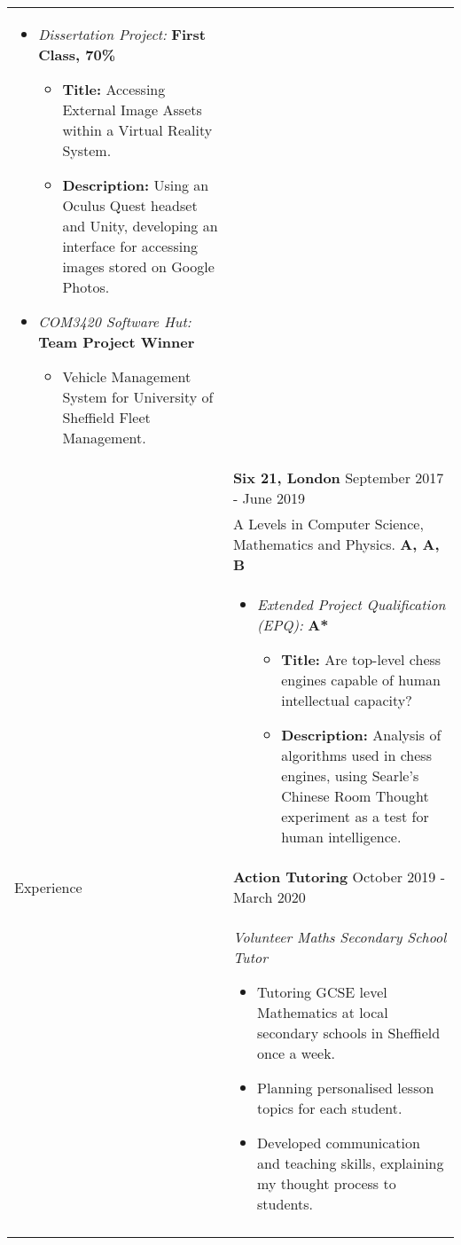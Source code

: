 \documentclass[11pt]{article}
\begin{document}
\begin{minipage}[t][0pt]{\linewidth}
\begin{tabular}[t]{p{2cm} p{14cm}}
	    \begin{itemize}
    		\renewcommand{\labelitemi}{$\diamond$}
        	    \item \textit{Dissertation Project:} \hfill \textbf{First Class, 70\%} 
        	    \begin{itemize}
    				\renewcommand{\labelitemii}{$\cdot$}
        			\item \textbf{Title:} Accessing External Image Assets within a Virtual Reality System.
        			\item \textbf{Description:} Using an Oculus Quest headset and Unity, developing an interface for accessing images stored on Google Photos.
			    \end{itemize}
	        	\item \textit{COM3420 Software Hut:} \hfill \textbf{Team Project Winner} 
        	    \begin{itemize}
    				\renewcommand{\labelitemii}{$\cdot$}
        			\item Vehicle Management System for University of Sheffield Fleet Management.
		        \end{itemize}
		\end{itemize} \\ &
		
		\textbf{Six 21, London} \hfill September 2017 - June 2019 \\ &
		A Levels in Computer Science, Mathematics and Physics. \hfill \textbf{A, A, B} \\ &
		
	    \begin{itemize}
    		\renewcommand{\labelitemi}{$\diamond$}
        	    \item \textit{Extended Project Qualification (EPQ):} \hfill \textbf{A*} 
        	    \begin{itemize}
    				\renewcommand{\labelitemii}{$\cdot$}
        			\item \textbf{Title:} Are top-level chess engines capable of human intellectual capacity?
        			\item \textbf{Description:} Analysis of algorithms used in chess engines, using Searle's Chinese Room Thought experiment as a test for human intelligence.
			    \end{itemize}
		\end{itemize} \\
	{Experience} &
		\textbf{Action Tutoring}  \hfill October 2019 - March 2020 \\ &
		\textit{Volunteer Maths Secondary School Tutor}
		\begin{itemize}
			\renewcommand{\labelitemi}{$\diamond$}
			\item Tutoring GCSE level Mathematics at local secondary schools in Sheffield once a week. 
			\item Planning personalised lesson topics for each student.
			\item Developed communication and teaching skills, explaining my thought process to students. 
		\end{itemize} \\ &
		

\end{tabular}
\end{minipage}
\end{document}
